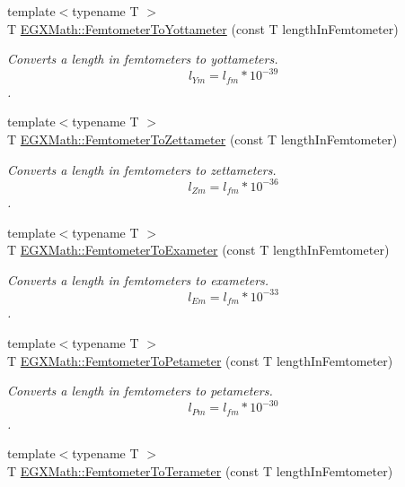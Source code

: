\begin{DoxyCompactItemize}
{\footnotesize template$<$typename T $>$ }\\T \mbox{\hyperlink{group___e_g_x_math-_conversions-_length_conversions-_s_i-_femtometer-_s_i_gabee380e1753dab5aa9aa433b8f3ce4d4}{E\+G\+X\+Math\+::\+Femtometer\+To\+Yottameter}} (const T length\+In\+Femtometer)
\begin{DoxyCompactList}\small\item\em Converts a length in femtometers to yottameters. \[ l_{Ym}=l_{fm} * 10^{-39} \]. \end{DoxyCompactList}\item 
{\footnotesize template$<$typename T $>$ }\\T \mbox{\hyperlink{group___e_g_x_math-_conversions-_length_conversions-_s_i-_femtometer-_s_i_ga4906b22484dc1005dd962a943a967b50}{E\+G\+X\+Math\+::\+Femtometer\+To\+Zettameter}} (const T length\+In\+Femtometer)
\begin{DoxyCompactList}\small\item\em Converts a length in femtometers to zettameters. \[ l_{Zm}=l_{fm} * 10^{-36} \]. \end{DoxyCompactList}\item 
{\footnotesize template$<$typename T $>$ }\\T \mbox{\hyperlink{group___e_g_x_math-_conversions-_length_conversions-_s_i-_femtometer-_s_i_ga44f78ba3f928c765acf6330b47ab3827}{E\+G\+X\+Math\+::\+Femtometer\+To\+Exameter}} (const T length\+In\+Femtometer)
\begin{DoxyCompactList}\small\item\em Converts a length in femtometers to exameters. \[ l_{Em}=l_{fm} * 10^{-33} \]. \end{DoxyCompactList}\item 
{\footnotesize template$<$typename T $>$ }\\T \mbox{\hyperlink{group___e_g_x_math-_conversions-_length_conversions-_s_i-_femtometer-_s_i_ga2145008022cfedfb81e40ceea426cda5}{E\+G\+X\+Math\+::\+Femtometer\+To\+Petameter}} (const T length\+In\+Femtometer)
\begin{DoxyCompactList}\small\item\em Converts a length in femtometers to petameters. \[ l_{Pm}=l_{fm} * 10^{-30} \]. \end{DoxyCompactList}\item 
{\footnotesize template$<$typename T $>$ }\\T \mbox{\hyperlink{group___e_g_x_math-_conversions-_length_conversions-_s_i-_femtometer-_s_i_ga9b76ed4edddb239375ea2ec8eb1cbc11}{E\+G\+X\+Math\+::\+Femtometer\+To\+Terameter}} (const T length\+In\+Femtometer)

\end{DoxyCompactItemize}
